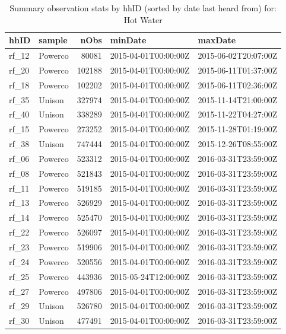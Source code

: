 \documentclass[]{article}
\begin{document}
\begin{table}

\caption{\label{tab:summaryTable}Summary observation stats by hhID (sorted by date last heard from) for: Hot Water}
\centering
\begin{tabular}[t]{l|l|r|l|l}
\hline
hhID & sample & nObs & minDate & maxDate\\
\hline
rf\_12 & Powerco & 80081 & 2015-04-01T00:00:00Z & 2015-06-02T20:07:00Z\\
\hline
rf\_20 & Powerco & 102188 & 2015-04-01T00:00:00Z & 2015-06-11T01:37:00Z\\
\hline
rf\_18 & Powerco & 102202 & 2015-04-01T00:00:00Z & 2015-06-11T02:36:00Z\\
\hline
rf\_35 & Unison & 327974 & 2015-04-01T00:00:00Z & 2015-11-14T21:00:00Z\\
\hline
rf\_40 & Unison & 338289 & 2015-04-01T00:00:00Z & 2015-11-22T04:27:00Z\\
\hline
rf\_15 & Powerco & 273252 & 2015-04-01T00:00:00Z & 2015-11-28T01:19:00Z\\
\hline
rf\_38 & Unison & 747444 & 2015-04-01T00:00:00Z & 2015-12-26T08:55:00Z\\
\hline
rf\_06 & Powerco & 523312 & 2015-04-01T00:00:00Z & 2016-03-31T23:59:00Z\\
\hline
rf\_08 & Powerco & 521843 & 2015-04-01T00:00:00Z & 2016-03-31T23:59:00Z\\
\hline
rf\_11 & Powerco & 519185 & 2015-04-01T00:00:00Z & 2016-03-31T23:59:00Z\\
\hline
rf\_13 & Powerco & 526929 & 2015-04-01T00:00:00Z & 2016-03-31T23:59:00Z\\
\hline
rf\_14 & Powerco & 525470 & 2015-04-01T00:00:00Z & 2016-03-31T23:59:00Z\\
\hline
rf\_22 & Powerco & 526097 & 2015-04-01T00:00:00Z & 2016-03-31T23:59:00Z\\
\hline
rf\_23 & Powerco & 519906 & 2015-04-01T00:00:00Z & 2016-03-31T23:59:00Z\\
\hline
rf\_24 & Powerco & 520556 & 2015-04-01T00:00:00Z & 2016-03-31T23:59:00Z\\
\hline
rf\_25 & Powerco & 443936 & 2015-05-24T12:00:00Z & 2016-03-31T23:59:00Z\\
\hline
rf\_27 & Powerco & 497806 & 2015-04-01T00:00:00Z & 2016-03-31T23:59:00Z\\
\hline
rf\_29 & Unison & 526780 & 2015-04-01T00:00:00Z & 2016-03-31T23:59:00Z\\
\hline
rf\_30 & Unison & 477491 & 2015-04-01T00:00:00Z & 2016-03-31T23:59:00Z\\

\end{tabular}
\end{table}
\end{document}
